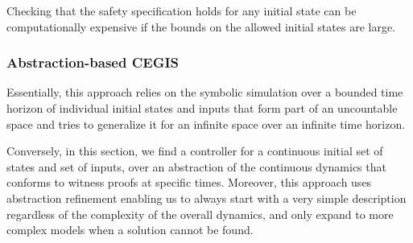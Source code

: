 \documentclass[twocolumn]{autart}    %
\begin{document}
Checking that the safety specification holds for any initial state can be
computationally expensive if the bounds on the allowed initial states are
large.

\subsubsection{Abstraction-based CEGIS} 
\label{sssec:abstraction}



Essentially, this approach relies on the symbolic simulation over a bounded
time horizon of individual initial states and inputs that form part of an
uncountable space and tries to generalize it for an infinite space over an
infinite time horizon.





Conversely, in this section, we find a controller for a continuous initial
set of states and set of inputs, over an abstraction of the continuous
dynamics \cite{cattaruzza2015unbounded} that conforms to witness proofs at
specific times.  %
Moreover, this approach uses abstraction refinement enabling us to always
start with a very simple description regardless of the complexity of the
overall dynamics, and only expand to more complex models when a solution
cannot be found.
\end{document}
